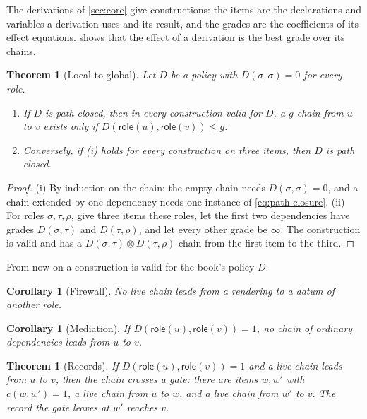 \documentclass[11pt]{article}
\numberwithin{equation}{section}
\theoremstyle{definition}
\theoremstyle{plain}
\newtheorem{theorem}[definition]{Theorem}
\newtheorem{corollary}[definition]{Corollary}
\theoremstyle{remark}
\newcommand{\role}{\mathsf{role}}
\newcommand{\absent}{\boldsymbol\infty}
\begin{document}
The derivations of \cref{sec:core} give constructions: the items are the
declarations and variables a derivation uses and its result, and the grades
are the coefficients of its effect equations.  
shows that the effect of a derivation is the best grade over its chains.

\begin{theorem}[Local to global]\label{thm:local-global}
Let \(D\) be a policy with \(D(\sigma,\sigma)=0\) for every role.
\begin{enumerate}[label=(\roman*),leftmargin=2.5em]
\item If \(D\) is path closed, then in every construction valid for \(D\),
a \(g\)-chain from \(u\) to \(v\) exists only if \(D(\role(u),\role(v))\le g\).
\item Conversely, if \textup{(i)} holds for every construction on three items,
then \(D\) is path closed.
\end{enumerate}
\end{theorem}

\begin{proof}
(i) By induction on the chain: the empty chain needs
\(D(\sigma,\sigma)=0\), and a chain extended by one dependency needs one
instance of \eqref{eq:path-closure}.  (ii) For roles \(\sigma,\tau,\rho\),
give three items these roles, let the first two dependencies have grades
\(D(\sigma,\tau)\) and \(D(\tau,\rho)\), and let every other grade be
\(\absent\).  The construction is valid and has a
\(D(\sigma,\tau)\otimes D(\tau,\rho)\)-chain from the first item to the third.
\end{proof}

From now on a construction is valid for the book's policy \(D\).

\begin{corollary}[Firewall]\label{cor:firewall}
No live chain leads from a rendering to a datum of another role.
\end{corollary}

\begin{corollary}[Mediation]\label{cor:mediation}
If \(D(\role(u),\role(v))=1\), no chain of ordinary dependencies leads from
\(u\) to \(v\).
\end{corollary}

\begin{theorem}[Records]\label{thm:records}
If \(D(\role(u),\role(v))=1\) and a live chain leads from \(u\) to \(v\),
then the chain crosses a gate: there are items \(w,w'\) with
\(c(w,w')=1\), a live chain from \(u\) to \(w\), and a live chain from
\(w'\) to \(v\).  The record the gate leaves at \(w'\) reaches \(v\).
\end{theorem}
\end{document}
